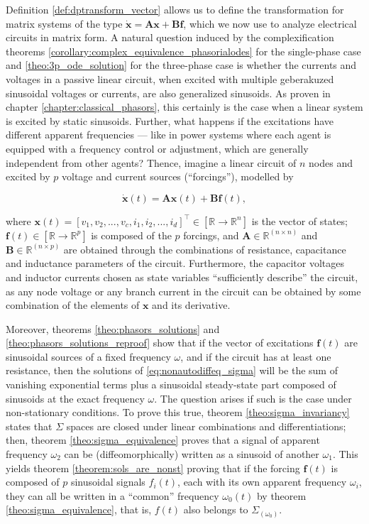 	Definition \ref{def:dptransform_vector} allows us to define the transformation for matrix systems of the type $\dot{\mathbf{x}} = \mathbf{Ax + Bf}$, which we now use to analyze electrical circuits in matrix form. A natural question induced by the complexification theorems \ref{corollary:complex_equivalence_phasorialodes} for the single-phase case and \ref{theo:3p_ode_solution} for the three-phase case is whether the currents and voltages in a passive linear circuit, when excited with multiple geberakuzed sinusoidal voltages or currents, are also generalized sinusoids. As proven in chapter \ref{chapter:classical_phasors}, this certainly is the case when a linear system is excited by static sinusoids. Further, what happens if the excitations have different apparent frequencies — like in power systems where each agent is equipped with a frequency control or adjustment, which are generally independent from other agents? Thence, imagine a linear circuit of $n$ nodes and excited by $p$ voltage and current sources (``forcings''), modelled by

\begin{equation} \dot{\mathbf{x}}(t) = \mathbf{Ax}(t) + \mathbf{Bf}(t), \label{eq:nonautodiffeq_sigma} \end{equation}

	\noindent where $\mathbf{x}(t) = \left[v_1,v_2,...,v_c,i_1,i_2,...,i_d\right]^\intercal\in \left[\mathbb{R}\to\mathbb{R}^n\right]$ is the vector of states; $\mathbf{f}(t)\in\left[\mathbb{R}\to\mathbb{R}^p\right]$ is composed of the $p$ forcings, and $\mathbf{A}\in\mathbb{R}^{(n\times n)}$ and $\mathbf{B}\in\mathbb{R}^{(n\times p)}$ are obtained through the combinations of resistance, capacitance and inductance parameters of the circuit. Furthermore, the capacitor voltages and inductor currents chosen as state variables ``sufficiently describe'' the circuit, as any node voltage or any branch current in the circuit can be obtained by some combination of the elements of $\mathbf{x}$ and its derivative.  

	Moreover, theorems \ref{theo:phasors_solutions} and \ref{theo:phasors_solutions_reproof} show that if the vector of excitations $\mathbf{f}(t)$ are sinusoidal sources of a fixed frequency $\omega$, and if the circuit has at least one resistance, then the solutions of \eqref{eq:nonautodiffeq_sigma} will be the sum of vanishing exponential terms plus a sinusoidal steady-state part composed of sinusoids at the exact frequency $\omega$. The question arises if such is the case under non-stationary conditions. To prove this true, theorem \ref{theo:sigma_invariancy} states that $\Sigma$ spaces are closed under linear combinations and differentiations; then, theorem \ref{theo:sigma_equivalence} proves that a signal of apparent frequency $\omega_2$ can be (diffeomorphically) written as a sinusoid of another $\omega_1$. This yields theorem \ref{theorem:sols_are_nonst} proving that if the forcing $\mathbf{f}(t)$ is composed of $p$ sinusoidal signals $f_i(t)$, each with its own apparent frequency $\omega_i$, they can all be written in a ``common'' frequency $\omega_0(t)$ by theorem \ref{theo:sigma_equivalence}, that is, $f(t)$ also belongs to $\Sigma_{\left(\omega_0\right)}$. 

